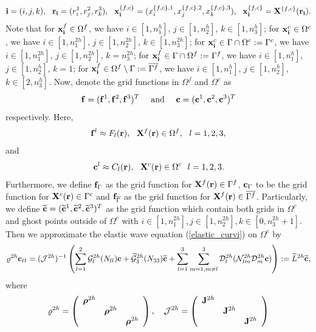 \[{\bf i} = (i,j,k),\ \ {\bf r}_{\bf i} = (r^1_i,r^2_j,r^3_k),\ \ {\bf x}^{\{f,c\}}_{\bf i} = (x^{\{f,c\},1}_i,x^{\{f,c\},2}_j,x^{\{f,c\},3}_k),\ \ {\bf x}_{\bf i}^{\{f,c\}} = {\bf X}^{\{f,c\}}({\bf r}_{\bf i}).\]
Note that for ${\bf x}^f_{\bf i}\in\Omega^f$, we have $i\in[1,n_1^h]$, $j\in[1,n_2^h]$, $k\in[1,n_3^h]$; for ${\bf x}^c_{\bf i}\in\Omega^c$, we have $i\in[1,n_1^{2h}]$, $j\in[1,n_2^{2h}]$, $k\in[1,n_3^{2h}]$; for ${\bf x}_{\bf i}^c \in \Gamma\cap\Omega^c := \Gamma^c$, we have $i\in[1,n_1^{2h}]$, $j\in[1,n_2^{2h}]$, $k = n_3^{2h}$; for ${\bf x}_{\bf i}^f \in \Gamma\cap\Omega^f := \Gamma^f$, we have $i\in[1,n_1^h]$, $j\in[1,n_2^h]$, $k = 1$; for ${\bf x}_{\bf i}^f\in \Omega^f \setminus \Gamma := \overline{\Gamma^f}$, we have $i\in[1,n_1^h]$, $j\in[1,n_2^h]$, $k\in[2,n_3^h]$. Now, denote the grid functions in $\Omega^f$ and $\Omega^c$ as
\[{\bf f} = ({\bf f}^1, {\bf f}^2, {\bf f}^3)^T\ \ \ \ \mbox{and}\ \ \ \  {\bf c} = ({\bf c}^1, {\bf c}^2, {\bf c}^3)^T\]
respectively. Here, 
\[{\bf f}^l\approx F_l({\bf r}), \ \ {\bf X}^f({\bf r})\in\Omega^f,\ \ l=1,2,3 ,\]
and
\[{\bf c}^l \approx C_l({\bf r}),\ \ {\bf X}^c({\bf r})\in\Omega^c \ \ l = 1,2,3.\]
Furthermore, we define ${\bf f}_{\Gamma}$ as the grid function for ${\bf X}^f({{\bf r}})\in\Gamma^f$, ${\bf c}_{\Gamma}$ to be the grid function for ${\bf X}^c({{\bf r}})\in\Gamma^c$ and ${\bf f}_{\overline{\Gamma}}$ as the grid function for ${\bf X}^f({{\bf r}})\in\overline{\Gamma^f}$. Particularly, we define $\widetilde{\bf c} = (\widetilde{\bf c}^1,\widetilde{\bf c}^2,\widetilde{\bf c}^3)^T$ as the grid function which contain both grids in $\Omega^c$ and ghost points outside of $\Omega^c$ with $i\in[1,n_1^{2h}], j\in[1,n_2^{2h}], k\in[0,n_3^{2h}+1]$. Then we approximate the elastic wave equation (\ref{elastic_curvi}) on $\Omega^c$ by
\begin{equation}\label{elastic_semi_c}
{\varrho}^{2h} {\bf c}_{tt} =( \mathcal{ J}^{2h})^{-1}\left(\sum_{l=1}^2\mathcal{G}_l^{2h}({N}_{ll}){\bf c}+\wt{\mathcal{G}}_3^{2h}({N}_{33}){\wt{\bf c}}+\sum_{l=1}^3\sum_{m=1,m\neq l}^3\mathcal{D}_l^{2h}(\mathcal{N}_{lm}^{2h}\mathcal{D}_m^{2h}{\bf c})\right) := \wt{L}^{2h} {\wt {\bf c}},
\end{equation}
where 
\begin{align}\label{rho_j}
\varrho^{2h} = \left(\begin{array}{ccc}
{\bm \rho}^{2h}& ~  & ~ \\
~ & {\bm \rho}^{2h} & ~ \\
~ &~  &{\bm \rho}^{2h}\end{array}\right),\ \ \ \mathcal{J}^{2h} = \left(\begin{array}{ccc}
{\bf J}^{2h}& ~  & ~ \\
~ & {\bf J}^{2h} & ~ \\
~ &~  &{\bf J}^{2h}\end{array}\right)
\end{align}
